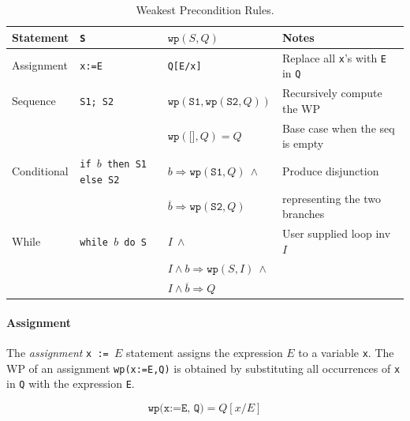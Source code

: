 \documentclass[oneside,11pt,dvipsnames]{book}
\renewcommand{\implies}{\Rightarrow}
\newcommand{\code}[1]{\texttt{#1}}
\begin{document}
\begin{table}
    \caption{Weakest Precondition Rules.}\label{tab:wp}
    \centering
    \footnotesize
\begin{tabular}{l|l|l|l}
\textbf{Statement} & \code{S} & $\code{wp}(S,Q)$ & Notes\\
\midrule
Assignment & \code{x:=E} & \code{Q[E/x]} & Replace all \code{x}'s with \code{E} in \code{Q} \\
\midrule
Sequence & \code{S1; S2} & $\code{wp}(\code{S1}, \code{wp}(\code{S2}, Q))$ & Recursively compute the WP\\
&& $\code{wp}(\code{[]}, Q) = Q$ & Base case when the seq is empty\\
\midrule
Conditional & \code{if $b$ then S1 else S2} & $b \implies \code{wp}(\code{S1},Q)~\land$ & Produce disjunction\\
  & & $\overline{b} \implies \code{wp}(\code{S2},Q)$ & representing the two branches\\
\midrule
While & \code{while $b$ do S} & $I ~\land $ & User supplied loop inv $I$\\
&& $I \land b \implies \code{wp}(S, I) ~\land$ &\\ 
&& $I \land \overline{b} \implies Q$ &\\ 
\bottomrule
\end{tabular}
\end{table}

\paragraph{Assignment} The \emph{assignment} \code{x\ :=\ $E$} statement assigns the expression
$E$ to a variable \code{x}. The WP of an assignment \code{wp(x:=E,Q)} is obtained by substituting all occurrences of
\code{x} in \code{Q} with the expression \code{E}. 

\begin{equation}\label{eq:wp-assign}
    \code{wp(x:=E, Q)} = Q[x/E]
\end{equation}
\end{document}
